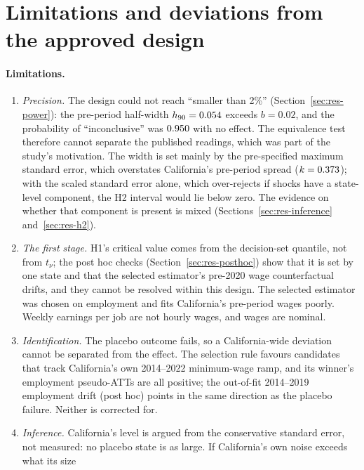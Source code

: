\section*{Limitations and deviations from the approved design}
\label{sec:limitations}

\paragraph{Limitations.}
\begin{enumerate}
  \item \emph{Precision.} The design could not reach ``smaller than 2\%'' (Section~\ref{sec:res-power}):
        the pre-period half-width $h_{90} = 0.054$ exceeds $b = 0.02$, and the probability
        of ``inconclusive'' was $0.950$ with no effect. The equivalence test therefore
        cannot separate the published readings, which was part of the study's motivation. The width
        is set mainly by the pre-specified maximum standard error, which overstates California's
        pre-period spread ($k = 0.373$); with the scaled standard error alone, which
        over-rejects if shocks have a state-level component, the H2 interval would lie below zero.
        The evidence on whether that component is present is mixed
        (Sections~\ref{sec:res-inference} and~\ref{sec:res-h2}).
  \item \emph{The first stage.} H1's critical value comes from the decision-set quantile, not from
        $t_\nu$; the post hoc checks (Section~\ref{sec:res-posthoc}) show that it is set by one state
        and that the selected estimator's pre-2020 wage counterfactual drifts, and they cannot be
        resolved within this design. The selected estimator was chosen on employment and fits
        California's pre-period wages poorly. Weekly earnings per job are not hourly wages, and wages
        are nominal.
  \item \emph{Identification.} The placebo outcome fails, so a California-wide deviation cannot be
        separated from the effect. The selection rule favours candidates that track California's own
        2014--2022 minimum-wage ramp, and its winner's employment pseudo-ATTs are all positive; the
        out-of-fit 2014--2019 employment drift (post hoc) points in the same direction as the placebo
        failure. Neither is corrected for.
  \item \emph{Inference.} California's level is argued from the conservative standard error, not
        measured: no placebo state is as large. If California's own noise exceeds what its size

\end{enumerate}
